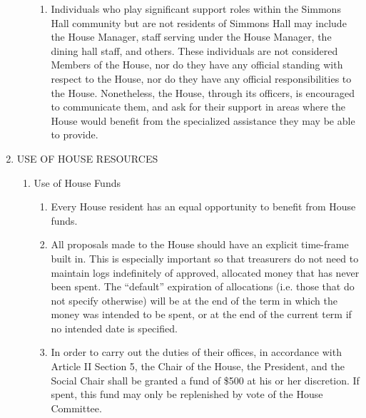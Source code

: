 \documentclass[letterpaper]{article}
\begin{document}
\begin{enumerate}
\begin{enumerate}
\begin{enumerate}

\item Individuals who play significant support roles within the Simmons Hall community but are not residents of Simmons Hall may include the House Manager, staff serving under the House Manager, the dining hall staff, and others. These individuals are not considered Members of the House, nor do they have any official standing with respect to the House, nor do they have any official responsibilities to the House. Nonetheless, the House, through its officers, is encouraged to
communicate them, and ask for their support in areas where the House would benefit from the specialized assistance they may be able to provide.

\end{enumerate}

\end{enumerate}

\item USE OF HOUSE RESOURCES 

\begin{enumerate}

\item Use of House Funds 

\begin{enumerate}

\item Every House resident has an equal opportunity to benefit from House funds.

\item All proposals made to the House should have an explicit time-frame built in. This is especially important so that treasurers do not need to maintain logs indefinitely of approved, allocated money that has never been spent. The ``default'' expiration of allocations (i.e. those that do not specify otherwise) will be at
the end of the term in which the money was intended to be spent, or at the end of the current term if no intended date is specified.

\item In order to carry out the duties of their offices, in accordance with Article II Section 5, the Chair of the House, the President, and the Social Chair shall be granted a fund of \$500 at his or her discretion. If spent, this fund may only be replenished by vote of the House Committee.

\end{enumerate}

\end{enumerate}


\end{enumerate}
\end{document}
